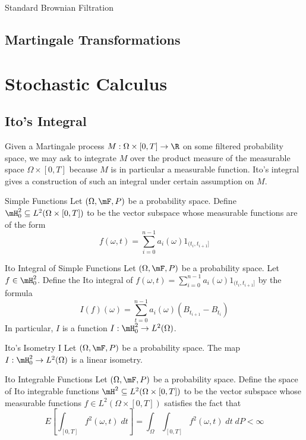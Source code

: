 \documentclass[a4paper]{article}
\begin{document}
\begin{defn}{Standard Brownian Filtration}{}
\end{defn}

\subsection{Martingale Transformations}

\pagebreak
\section{Stochastic Calculus}
\subsection{Ito's Integral}
Given a Martingale process $M:\Omega\times[0,T]\to\R$ on some filtered probability space, we may ask to integrate $M$ over the product measure of the measurable space $\Omega\times[0,T]$ because $M$ is in particular a measurable function. Ito's integral gives a construction of such an integral under certain assumption on $M$. 

\begin{defn}{Simple Functions}{} Let $(\Omega,\mF,P)$ be a probability space. Define $\mH_0^2\subseteq L^2(\Omega\times[0,T])$ to be the vector subspace whose measurable functions are of the form $$f(\omega,t)=\sum_{i=0}^{n-1}a_i(\omega)1_{(t_i,t_{i+1}]}$$
\end{defn}

\begin{defn}{Ito Integral of Simple Functions}{} Let $(\Omega,\mF,P)$ be a probability space. Let $f\in\mH_0^2$. Define the Ito integral of $f(\omega,t)=\sum_{i=0}^{n-1}a_i(\omega)1_{(t_i,t_{i+1}]}$ by the formula $$I(f)(\omega)=\sum_{t=0}^{n-1}a_i(\omega)(B_{t_{i+1}}-B_{t_i})$$ In particular, $I$ is a function $I:\mH_0^2\to L^2(\Omega)$. 
\end{defn}

\begin{lmm}{Ito's Isometry I}{} Let $(\Omega,\mF,P)$ be a probability space. The map $I:\mH_0^2\to L^2(\Omega)$ is a linear isometry. 
\end{lmm}

\begin{defn}{Ito Integrable Functions}{} Let $(\Omega,\mF,P)$ be a probability space. Define the space of Ito integrable functions $\mH^2\subseteq L^2(\Omega\times[0,T])$ to be the vector subspace whose measurable functions $f\in L^2(\Omega\times[0,T])$ satisfies the fact that $$E\left[\int_{[0,T]}f^2(\omega,t)\;dt\right]=\int_\Omega\int_{[0,T]}f^2(\omega,t)\;dt\;dP<\infty$$
\end{defn}
\end{document}
